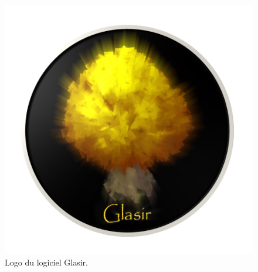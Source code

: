     \vspace{4mm}

    \begin{figure}[H]
        \centering
        \includegraphics[height=0.5\textwidth]{figure/glasir.png}
        \caption{Logo du logiciel Glasir.}
        \label{fig:glasir}
    \end{figure}
